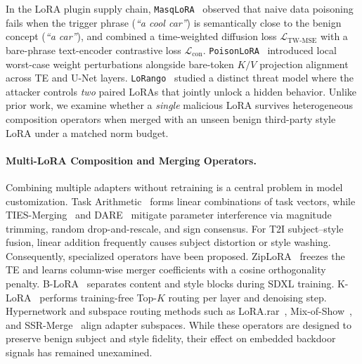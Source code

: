 \documentclass[10pt,twocolumn,letterpaper]{article}
\begin{document}
In the LoRA plugin supply chain, \texttt{MasqLoRA}~\cite{lyu2026masqlora} observed that naive data poisoning fails when the trigger phrase (\textit{``a cool car''}) is semantically close to the benign concept (\textit{``a car''}), and combined a time-weighted diffusion loss $\mathcal{L}_{\text{TW-MSE}}$ with a bare-phrase text-encoder contrastive loss $\mathcal{L}_{\text{con}}$. \texttt{PoisonLoRA}~\cite{poisonlora2026} introduced local worst-case weight perturbations alongside bare-token $K/V$ projection alignment across TE and U-Net layers. \texttt{LoRango}~\cite{lorango2026} studied a distinct threat model where the attacker controls \textit{two} paired LoRAs that jointly unlock a hidden behavior. Unlike prior work, we examine whether a \textit{single} malicious LoRA survives heterogeneous composition operators when merged with an unseen benign third-party style LoRA under a matched norm budget.

\paragraph{Multi-LoRA Composition and Merging Operators.}
Combining multiple adapters without retraining is a central problem in model customization. Task Arithmetic~\cite{ilharco2023editing} forms linear combinations of task vectors, while TIES-Merging~\cite{yadav2023ties} and DARE~\cite{yu2024dare} mitigate parameter interference via magnitude trimming, random drop-and-rescale, and sign consensus. For T2I subject--style fusion, linear addition frequently causes subject distortion or style washing. Consequently, specialized operators have been proposed. ZipLoRA~\cite{shah2024ziplora} freezes the TE and learns column-wise merger coefficients with a cosine orthogonality penalty. B-LoRA~\cite{frenkel2024blora} separates content and style blocks during SDXL training. K-LoRA~\cite{ouyang2025klora} performs training-free Top-$K$ routing per layer and denoising step. Hypernetwork and subspace routing methods such as LoRA.rar~\cite{shen2025lorarar}, Mix-of-Show~\cite{gu2023mixofshow}, and SSR-Merge~\cite{ssrmerge2026} align adapter subspaces. While these operators are designed to preserve benign subject and style fidelity, their effect on embedded backdoor signals has remained unexamined.
\end{document}
